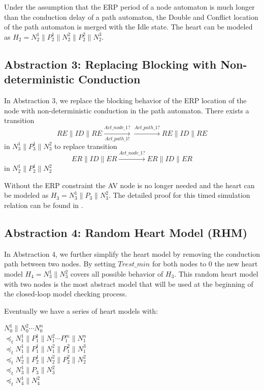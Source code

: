 Under the assumption that the ERP period of a node automaton is much longer than the conduction delay of a path automaton,  the \textsf{Double} and \textsf{Conflict} location of the path automaton is merged with the \textsf{Idle} state. The heart can be modeled as $H_2=N_2^1\| P_2^1\| N_2^2\| P_2^2\| N_2^3$.

\subsection{Abstraction 3: Replacing Blocking with Non-deterministic Conduction}
In Abstraction 3, we replace the blocking behavior of the \textsf{ERP} location of the node with non-deterministic conduction in the path automaton. There exists a transition\\ 
$$RE\| ID\| RE \xrightarrow[Act\_path\_1!]{Act\_node\_1?}\xrightarrow{Act\_path\_1?}RE\| ID\| RE$$
in $N_3^1\| P_3^1\| N_3^2$ to replace transition\\
$$ER\| ID\| ER \xrightarrow{Act\_node\_1?} ER\| ID\| ER$$
in $N_2^1\| P_2^1\| N_2^2$

Without the ERP constraint the AV node is no longer needed and the heart can be modeled as $H_3=N_3^1\| P_3\| N_3^2$.  The detailed proof for this timed simulation relation can be found in \cite{STTT13}. 
\subsection{Abstraction 4: Random Heart Model (RHM)}
In Abstraction 4, we further simplify the heart model by removing the conduction path between two nodes. By setting $Trest\_min$ for both nodes to 0 the new heart model $H_4=N_3^1\|N_3^2$ covers all possible behavior of $H_3$. This random heart model with two nodes is the most abstract model that will be used at the beginning of the closed-loop model checking process.

Eventually we have a series of heart models with:

$N_0^1\|N_0^2\cdots N_0^n$\\
$\preceq_t N_1^1\|P_1^1\|N_1^2\cdots P_1^{m}\|N_1^n$\\
$\preceq_t N_1^1\| P_1^1 \| N_1^2\| P_1^2 \| N_1^3$\\
$\preceq_t N_2^1\| P_2^1\| N_2^2\| P_2^2\| N_2^2$\\
$\preceq_t N_3^1\| P_3\| N_3^2$\\
$\preceq_t N_4^1\| N_4^2$

